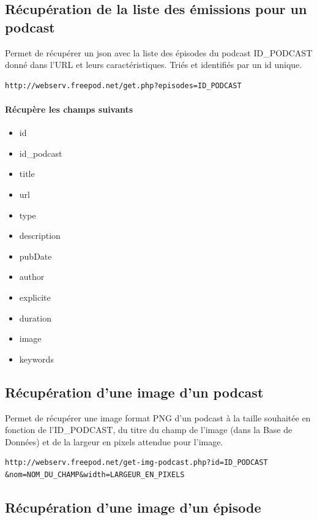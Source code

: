 \documentclass[11pt, french]{report}
\begin{document}
\subsection*{Récupération de la liste des émissions pour un podcast}
Permet de récupérer un json avec la liste des épisodes du podcast ID\_PODCAST donné dans l'URL et leurs caractéristiques. Triés et identifiés par un id unique.

\begin{lstlisting}
http://webserv.freepod.net/get.php?episodes=ID_PODCAST
\end{lstlisting}

\paragraph{Récupère les champs suivants}

\begin{itemize}
\item id
\item id\_podcast
\item title
\item url
\item type
\item description
\item pubDate
\item author
\item explicite
\item duration
\item image
\item keywords
\end{itemize}

\subsection*{Récupération d'une image d'un podcast}

Permet de récupérer une image format PNG d'un podcast à la taille souhaitée en fonction de l'ID\_PODCAST, du titre du champ de l'image (dans la Base de Données) et de la largeur en pixels attendue pour l'image.

\begin{lstlisting}
http://webserv.freepod.net/get-img-podcast.php?id=ID_PODCAST
&nom=NOM_DU_CHAMP&width=LARGEUR_EN_PIXELS
\end{lstlisting}

\subsection*{Récupération d'une image d'un épisode}
\end{document}
